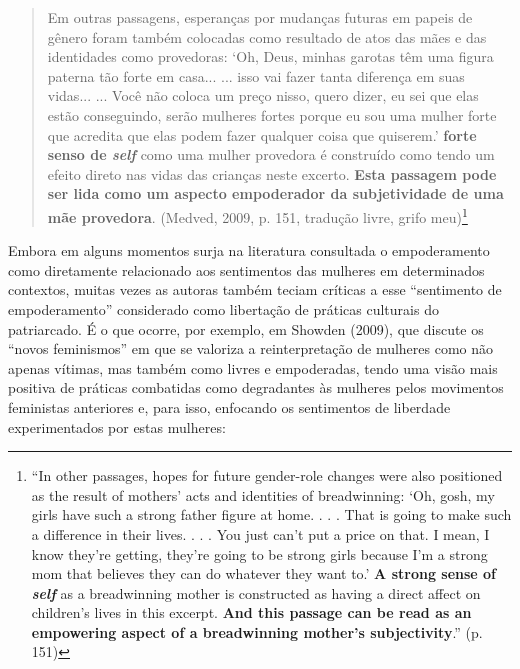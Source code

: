 \begin{quote}
    Em outras passagens, esperanças por mudanças futuras em papeis de gênero foram também colocadas como resultado de atos das mães e das identidades como provedoras: ‘Oh, Deus, minhas garotas têm uma figura paterna tão forte em casa... ... isso vai fazer tanta diferença em suas vidas... ... Você não coloca um preço nisso, quero dizer, eu sei que elas estão conseguindo, serão mulheres fortes porque eu sou uma mulher forte que acredita que elas podem fazer qualquer coisa que quiserem.’ \textbf{forte senso de \textit{self}} como uma mulher provedora é construído como tendo um efeito direto nas vidas das crianças neste excerto. \textbf{Esta passagem pode ser lida como um aspecto empoderador da subjetividade de uma mãe provedora}. (Medved, 2009, p. 151, tradução livre, grifo meu)\footnote{“In other passages, hopes for future gender-role changes were also positioned as the result of mothers’ acts and identities of breadwinning: ‘Oh, gosh, my girls have such a strong father figure at home. . . . That is going to make such a difference in their lives. . . . You just can’t put a price on that. I mean, I know they’re getting, they’re going to be strong girls because I’m a strong mom that believes they can do whatever they want to.’ \textbf{A strong sense of \textit{self}} as a breadwinning mother is constructed as having a direct affect on children’s lives in this excerpt. \textbf{And this passage can be read as an empowering aspect of a breadwinning mother’s subjectivity}.” (p. 151)}
\end{quote}

Embora em alguns momentos surja na literatura consultada o empoderamento como diretamente relacionado aos sentimentos das mulheres em determinados contextos, muitas vezes as autoras também teciam críticas a esse “sentimento de empoderamento” considerado como libertação de práticas culturais do patriarcado. É o que ocorre, por exemplo, em Showden (2009), que discute os “novos feminismos” em que se valoriza a reinterpretação de mulheres como não apenas vítimas, mas também como livres e empoderadas, tendo uma visão mais positiva de práticas combatidas como degradantes às mulheres pelos movimentos feministas anteriores e, para isso, enfocando os sentimentos de liberdade experimentados por estas mulheres:

